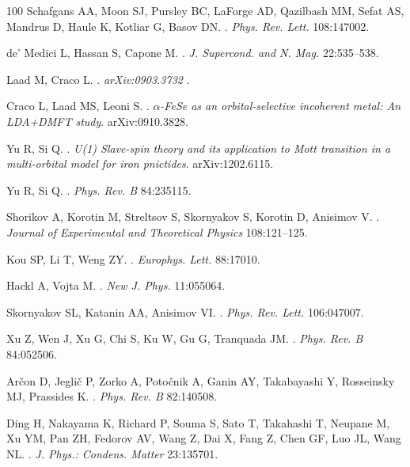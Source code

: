 \documentclass[]{ar2e-changed}%
\begin{document}
\begin{thebibliography}{100}
Schafgans AA, Moon SJ, Pursley BC, LaForge AD, Qazilbash MM, Sefat AS, Mandrus
  D, Haule K, Kotliar G, Basov DN.
.
\newblock \emph{Phys. Rev. Lett.} 108:147002.

de' Medici L, Hassan S, Capone M.
.
\newblock \emph{J. Supercond. and N. Mag.} 22:535--538.

Laad M, Craco L.
.
\newblock \emph{arXiv:0903.3732} .

{Craco} L, {Laad} MS, {Leoni} S.
.
\newblock \emph{{{$\alpha$}-FeSe as an orbital-selective incoherent metal: An
  LDA+DMFT study}}.
\newblock arXiv:0910.3828.

{Yu} R, {Si} Q.
.
\newblock \emph{{U(1) Slave-spin theory and its application to Mott transition
  in a multi-orbital model for iron pnictides}}.
\newblock arXiv:1202.6115.

Yu R, Si Q.
.
\newblock \emph{Phys. Rev. B} 84:235115.

Shorikov A, Korotin M, Streltsov S, Skornyakov S, Korotin D, Anisimov V.
.
\newblock \emph{Journal of Experimental and Theoretical Physics} 108:121--125.

Kou SP, Li T, Weng ZY.
.
\newblock \emph{Europhys. Lett.} 88:17010.

Hackl A, Vojta M.
.
\newblock \emph{New J. Phys.} 11:055064.

Skornyakov SL, Katanin AA, Anisimov VI.
.
\newblock \emph{Phys. Rev. Lett.} 106:047007.

Xu Z, Wen J, Xu G, Chi S, Ku W, Gu G, Tranquada JM.
.
\newblock \emph{Phys. Rev. B} 84:052506.

Ar\v{c}on D, Jegli\v{c} P, Zorko A, Poto\v{c}nik A, Ganin AY, Takabayashi Y,
  Rosseinsky MJ, Prassides K.
.
\newblock \emph{Phys. Rev. B} 82:140508.

Ding H, Nakayama K, Richard P, Souma S, Sato T, Takahashi T, Neupane M, Xu YM,
  Pan ZH, Fedorov AV, Wang Z, Dai X, Fang Z, Chen GF, Luo JL, Wang NL.
.
\newblock \emph{J. Phys.: Condens. Matter} 23:135701.


\end{thebibliography}
\end{document}
